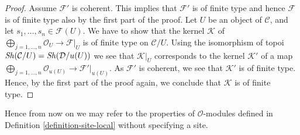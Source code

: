\begin{proof}
\medskip\noindent
Assume $\mathcal{F}'$ is coherent. This implies that $\mathcal{F}'$
is of finite type and hence $\mathcal{F}$ is of finite type also by the
first part of the proof. Let $U$ be an object of $\mathcal{C}$, and let
$s_1, \ldots, s_n \in \mathcal{F}(U)$. We have to show that the kernel
$\mathcal{K}$ of
$\bigoplus_{j = 1, \ldots, n} \mathcal{O}_U \to \mathcal{F}|_U$
is of finite type on $\mathcal{C}/U$. Using the isomorphism of topoi
$\mathop{\mathit{Sh}}\nolimits(\mathcal{C}/U) = \mathop{\mathit{Sh}}\nolimits(\mathcal{D}/u(U))$
we see that $\mathcal{K}|_U$ corresponds to the kernel
$\mathcal{K}'$ of a map
$\bigoplus_{j = 1, \ldots, n} \mathcal{O}_{u(U)} \to \mathcal{F}'|_{u(U)}$.
As $\mathcal{F}'$ is coherent, we see that $\mathcal{K}'$ is of finite
type. Hence, by the first part of the proof again, we conclude
that $\mathcal{K}$ is of finite type.
\end{proof}

\noindent
Hence from now on we may refer to the properties of $\mathcal{O}$-modules
defined in Definition \ref{definition-site-local} without specifying a site.

